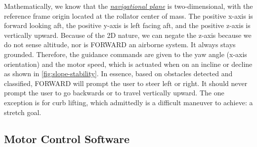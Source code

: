 \noindent Mathematically, we know that the \underline{\textit{navigational plane}} is two-dimensional, with the reference frame origin located at the rollator center of mass. The positive x-axis is forward looking aft, the positive y-axis is left facing aft, and the positive z-axis is vertically upward. Because of the 2D nature, we can negate the z-axis because we do not sense altitude, nor is FORWARD an airborne system. It always stays grounded. Therefore, the guidance commands are given to the yaw angle (x-axis orientation) and the motor speed, which is actuated when on an incline or decline as shown in \ref{fig:slope-stability}. In essence, based on obstacles detected and classified, FORWARD will prompt the user to steer left or right. It should never prompt the user to go backwards or to travel vertically upward. The one exception is for curb lifting, which admittedly is a difficult maneuver to achieve: a stretch goal.\\

\subsection{Motor Control Software}


\\